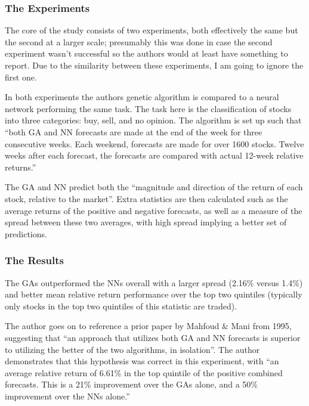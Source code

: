 \subsubsection{The Experiments}

The core of the study consists of two experiments, both effectively the same but the second at a larger scale; presumably this was done in case the second experiment wasn't successful so the authors would at least have something to report. Due to the similarity between these experiments, I am going to ignore the first one. \newline

In both experiments the authors genetic algorithm is compared to a neural network performing the same task. The task here is the classification of stocks into three categories: buy, sell, and no opinion. The algorithm is set up such that ``both GA and NN forecasts are made at the end of the week for three consecutive weeks. Each weekend, forecasts are made for over 1600 stocks. Twelve weeks after each forecast, the forecasts are compared with actual 12-week relative returns.'' \newline

The GA and NN predict both the ``magnitude and direction of the return of each stock, relative to the market''. Extra statistics are then calculated such as the average returns of the positive and negative forecasts, as well as a measure of the spread between these two averages, with high spread implying a better set of predictions.

\subsubsection{The Results}

The GAs outperformed the NNs overall with a larger spread (2.16\% versus 1.4\%) and better mean relative return performance over the top two quintiles (typically only stocks in the top two quintiles of this statistic are traded). \newline

The author goes on to reference a prior paper by Mahfoud \& Mani from 1995, suggesting that ``an approach that utilizes both GA and NN forecasts is superior to utilizing the better of the two algorithms, in isolation''. The author demonstrates that this hypothesis was correct in this experiment, with ``an average relative return of 6.61\% in the top quintile of the positive combined forecasts. This is a 21\% improvement over the GAs alone, and a 50\% improvement over the NNs alone.''

